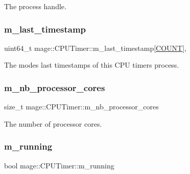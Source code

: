 The process handle. \hypertarget{classmage_1_1_c_p_u_timer_a1334979cc0c39a8aa667f289f90fb78d}{}\label{classmage_1_1_c_p_u_timer_a1334979cc0c39a8aa667f289f90fb78d} 
\subsubsection{\texorpdfstring{m\+\_\+last\+\_\+timestamp}{m\_last\_timestamp}}
{\footnotesize\ttfamily uint64\+\_\+t mage\+::\+C\+P\+U\+Timer\+::m\+\_\+last\+\_\+timestamp\mbox{[}\hyperlink{classmage_1_1_c_p_u_timer_a95a81bb0f32d2cc9881f311a0f6fa895a780a9a1245e4e551833ba02eb606bdf8}{C\+O\+U\+NT}\mbox{]}\hspace{0.3cm}{\ttfamily [mutable]}, {\ttfamily [private]}}

The modes\textquotesingle{} last timestamps of this C\+PU timer\textquotesingle{}s process. \hypertarget{classmage_1_1_c_p_u_timer_ac5fdb38a70c74815231b5efd8d746be1}{}\label{classmage_1_1_c_p_u_timer_ac5fdb38a70c74815231b5efd8d746be1} 
\subsubsection{\texorpdfstring{m\+\_\+nb\+\_\+processor\+\_\+cores}{m\_nb\_processor\_cores}}
{\footnotesize\ttfamily size\+\_\+t mage\+::\+C\+P\+U\+Timer\+::m\+\_\+nb\+\_\+processor\+\_\+cores\hspace{0.3cm}{\ttfamily [private]}}

The number of processor cores. \hypertarget{classmage_1_1_c_p_u_timer_a7190afa453085b7bbd7cb76ff6bb62f2}{}\label{classmage_1_1_c_p_u_timer_a7190afa453085b7bbd7cb76ff6bb62f2} 
\subsubsection{\texorpdfstring{m\+\_\+running}{m\_running}}
{\footnotesize\ttfamily bool mage\+::\+C\+P\+U\+Timer\+::m\+\_\+running\hspace{0.3cm}{\ttfamily [private]}}

